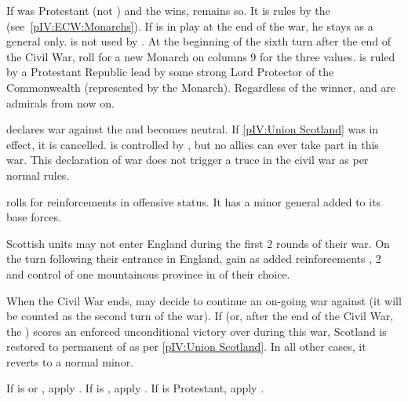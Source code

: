 \aparag If \ENG was Protestant (not \PROTANG) and the \parl wins, \ENG remains
so. It is rules by the  (see~\ref{pIV:ECW:Monarchs}).
\bparag If \leaderCromwell is in play at the end of the war, he stays as a
general only. \leaderRupertang is not used by \ENG.
\bparag At the beginning of the sixth turn after the end of the Civil War,
roll for a new Monarch on columns 9 for the three values. \ENG is ruled by a
Protestant Republic lead by some strong Lord Protector of the Commonwealth
(represented by the Monarch).
\aparag Regardless of the winner, \leaderMonck and \leaderBlake are admirals
from now on.



\phevnt
\aparag \paysecosse declares war against the \royal and becomes neutral.  If
\ref{pIV:Union Scotland} was in effect, it is cancelled.  \paysecosse is
controlled by \FRA, but no allies can ever take part in this war. This
declaration of war does not trigger a truce in the civil war as per normal
rules.

\phadm
\aparag \paysecosse rolls for reinforcements in offensive status.  It has a
minor general added to its base forces.

\phmil
\aparag Scottish units may not enter England during the first 2 rounds of
their war.
\aparag On the turn following their entrance in England, \royal gain as added
reinforcements , 2 \LD and control of one mountainous
province in \paysecosse of their choice.

\phpaix
\aparag When the Civil War ends, \ENG may decide to continue an on-going war
against \paysecosse (it will be counted as the second turn of the war).
\aparag If \ENG (\royal or, after the end of the Civil War, the \parl) scores
an enforced unconditional victory over \paysecosse during this war, Scotland
is restored to permanent \VASSAL of \ENG as per \ref{pIV:Union Scotland}.  In
all other cases, it reverts to a normal minor.






\phevnt
\aparag If \ENG is \PROTANG or \CATHCO, apply .
\aparag If \ENG is \CATHCR, apply .
\aparag If \ENG is Protestant, apply .


